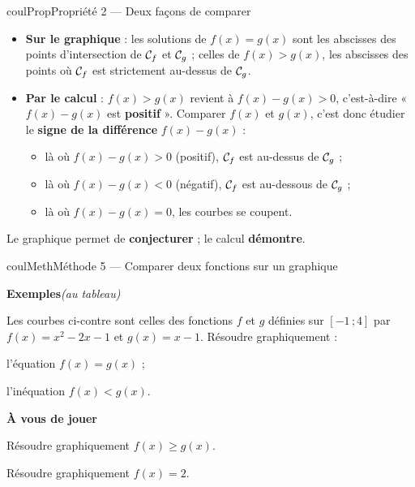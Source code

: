 \documentclass[11pt,a4paper]{article}
\makeatletter
\renewcommand{\ge}{\geqslant}
\newcommand{\lycee@repere}[4]{%
  \draw[grille,step=1] (#1,#2) grid (#3,#4);
  \draw[-{Stealth[length=2mm]},thick] (#1,0)--({#3+0.4},0) node[below left=-1pt]{$x$};
  \draw[-{Stealth[length=2mm]},thick] (0,#2)--(0,{#4+0.4}) node[below left=-1pt]{$y$};
  \node[below left,font=\scriptsize,inner sep=1.5pt] at (0,0) {$0$};}
\newcommand{\lycee@gradx}[1]{\foreach \k/\l in {#1}{%
  \draw (\k,0.07)--(\k,-0.07) node[below,font=\scriptsize,inner sep=1.5pt]{$\l$};}}
\newcommand{\lycee@grady}[1]{\foreach \k/\l in {#1}{%
  \draw (0.07,\k)--(-0.07,\k) node[left,font=\scriptsize,inner sep=1.5pt]{$\l$};}}
\newcommand{\lycee@intff}[2]{\left[#1\,;#2\right]}
\providecommand{\repere}{\lycee@repere}%
\providecommand{\gradx}{\lycee@gradx}%
\providecommand{\grady}{\lycee@grady}%
\providecommand{\Cf}{\mathcal{C}\sb{f}}%
\providecommand{\Cg}{\mathcal{C}\sb{g}}%
\providecommand{\intff}{\lycee@intff}%
\newcounter{lycee@signet}
\newcommand{\signet}[3][]{\stepcounter{lycee@signet}%
  \edef\lycee@dest{\if\relax\detokenize{#1}\relax
    signet.\arabic{lycee@signet}\else#1\fi}%
  \hypertarget{\lycee@dest}{}\bookmark[level=#2,dest=\lycee@dest]{#3}}
\newcounter{methode}
\newenvironment{proprietebox}[1][Propriété]%
  {\begin{boitecours}[phantom={\signet{2}{#1}}]{coulProp}{#1}}{\end{boitecours}}
\newenvironment{methodebox}[1][Méthode]{\stepcounter{methode}%
  \begin{boitecours}[phantom={\signet[methode-\arabic{methode}]{2}{#1}}]{coulMeth}{#1}}%
  {\end{boitecours}}
\newcommand{\etape}[1]{\par\smallskip\textbf{\color{coulMeth}#1}\par\nobreak\smallskip}
\newcommand{\autableau}{\hfill{\footnotesize\itshape\color{black!45}(au tableau)}}
\newcommand{\etapeexemples}{%
    \par\smallskip\textbf{\color{coulMeth}Exemples}\autableau\par\nobreak\smallskip}
\makeatother
\begin{document}
\begin{proprietebox}[Propriété 2 --- Deux façons de comparer]
\begin{itemize}
  \item \textbf{Sur le graphique} : les solutions de $f(x)=g(x)$ sont les abscisses des
        points d'intersection de $\Cf$ et $\Cg$ ; celles de $f(x)>g(x)$, les abscisses
        des points où $\Cf$ est strictement au-dessus de $\Cg$.
  \item \textbf{Par le calcul} : $f(x)>g(x)$ revient à $f(x)-g(x)>0$, c'est-à-dire
        « $f(x)-g(x)$ est \textbf{positif} ». Comparer $f(x)$ et $g(x)$, c'est donc
        étudier le \textbf{signe de la différence} $f(x)-g(x)$ :
        \begin{itemize}
          \item là où $f(x)-g(x)>0$ (positif), $\Cf$ est au-dessus de $\Cg$ ;
          \item là où $f(x)-g(x)<0$ (négatif), $\Cf$ est au-dessous de $\Cg$ ;
          \item là où $f(x)-g(x)=0$, les courbes se coupent.
        \end{itemize}
\end{itemize}
Le graphique permet de \textbf{conjecturer} ; le calcul \textbf{démontre}.
\end{proprietebox}

\begin{methodebox}[Méthode 5 --- Comparer deux fonctions sur un graphique]
\etapeexemples
\begin{minipage}[t]{0.58\linewidth}\raggedright
\vspace{0pt}
Les courbes ci-contre sont celles des fonctions $f$ et $g$ définies sur $\intff{-1}{4}$ par
$f(x)=x^{2}-2x-1$ et $g(x)=x-1$. Résoudre graphiquement :
\begin{questions}[label=\alph*)]
  \item l'équation $f(x)=g(x)$ ;
  \item l'inéquation $f(x)<g(x)$.
\end{questions}
\end{minipage}\hfill
\begin{minipage}[t]{0.38\linewidth}\centering
\vspace{0pt}
\end{minipage}

\etape{À vous de jouer}
\begin{questions}
  \item Résoudre graphiquement $f(x)\ge g(x)$.
  \item Résoudre graphiquement $f(x)=2$.
\end{questions}

\end{methodebox}
\end{document}
